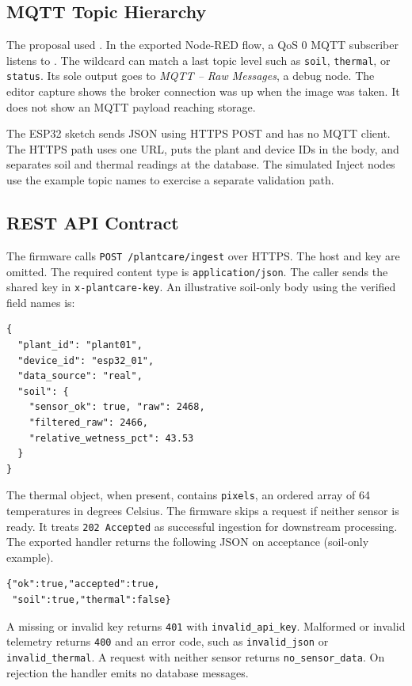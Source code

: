 \documentclass{ieeeaccess}
\newcommand{\code}[1]{\texttt{#1}}
\begin{document}
\subsection{MQTT Topic Hierarchy}
The proposal used . In the exported Node-RED flow, a QoS 0 MQTT subscriber listens to . The wildcard can match a last topic level such as \code{soil}, \code{thermal}, or \code{status}. Its sole output goes to \emph{MQTT -- Raw Messages}, a debug node. The editor capture shows the broker connection was up when the image was taken. It does not show an MQTT payload reaching storage.

The ESP32 sketch sends JSON using HTTPS POST and has no MQTT client. The HTTPS path uses one URL, puts the plant and device IDs in the body, and separates soil and thermal readings at the database. The simulated Inject nodes use the example topic names to exercise a separate validation path.

\subsection{REST API Contract}
The firmware calls \code{POST /plantcare/ingest} over HTTPS. The host and key are omitted. The required content type is \code{application/json}. The caller sends the shared key in \code{x-plantcare-key}. An illustrative soil-only body using the verified field names is:

{\footnotesize
\begin{verbatim}
{
  "plant_id": "plant01",
  "device_id": "esp32_01",
  "data_source": "real",
  "soil": {
    "sensor_ok": true, "raw": 2468,
    "filtered_raw": 2466,
    "relative_wetness_pct": 43.53
  }
}
\end{verbatim}
}
The thermal object, when present, contains \code{pixels}, an ordered array of 64 temperatures in degrees Celsius. The firmware skips a request if neither sensor is ready. It treats \code{202 Accepted} as successful ingestion for downstream processing. The exported handler returns the following JSON on acceptance (soil-only example).
{\footnotesize
\begin{verbatim}
{"ok":true,"accepted":true,
 "soil":true,"thermal":false}
\end{verbatim}
}
A missing or invalid key returns \code{401} with \code{invalid\_api\_key}. Malformed or invalid telemetry returns \code{400} and an error code, such as \code{invalid\_json} or \code{invalid\_thermal}. A request with neither sensor returns \code{no\_sensor\_data}. On rejection the handler emits no database messages.
\end{document}
